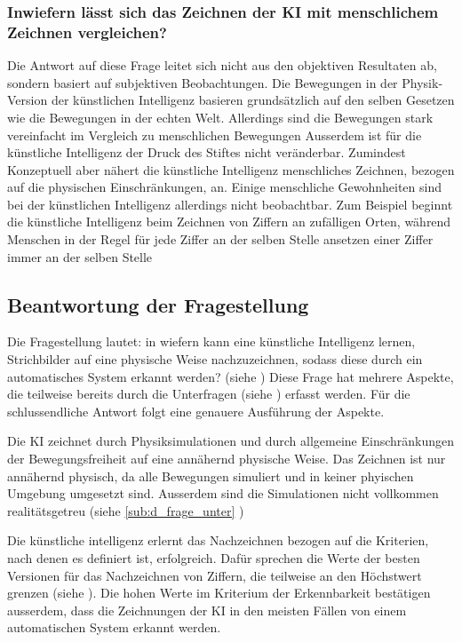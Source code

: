 \subsubsection*{Inwiefern lässt sich das Zeichnen der KI mit menschlichem Zeichnen vergleichen?}
\label{subsub:d_frage_unter_6}
Die Antwort auf diese Frage leitet sich nicht aus den objektiven Resultaten ab,
sondern basiert auf subjektiven Beobachtungen. Die Bewegungen in der
Physik-Version der künstlichen Intelligenz basieren grundsätzlich auf den selben
Gesetzen wie die Bewegungen in der echten Welt. Allerdings sind die Bewegungen
stark vereinfacht im Vergleich zu menschlichen Bewegungen Ausserdem ist für die
künstliche Intelligenz der Druck des Stiftes nicht veränderbar. Zumindest
Konzeptuell aber nähert die künstliche Intelligenz menschliches Zeichnen,
bezogen auf die physischen Einschränkungen, an. Einige menschliche Gewohnheiten
sind bei der künstlichen Intelligenz allerdings nicht beobachtbar. Zum Beispiel
beginnt die künstliche Intelligenz beim Zeichnen von Ziffern an zufälligen
Orten, während Menschen in der Regel für jede Ziffer an der selben Stelle
ansetzen einer Ziffer immer an der selben Stelle


\subsection{Beantwortung der Fragestellung}
\label{sub:d_frage_frag}
Die Fragestellung lautet: in wiefern kann eine künstliche Intelligenz lernen,
Strichbilder auf eine physische Weise nachzuzeichnen, sodass diese durch ein
automatisches System erkannt werden? (siehe ) Diese Frage
hat mehrere Aspekte, die teilweise bereits durch die Unterfragen (siehe
) erfasst werden. Für die schlussendliche Antwort
folgt eine genauere Ausführung der Aspekte.

Die KI zeichnet durch Physiksimulationen und durch allgemeine Einschränkungen
der Bewegungsfreiheit auf eine annähernd physische Weise. Das Zeichnen ist nur
annähernd physisch, da alle Bewegungen simuliert und in keiner phyischen
Umgebung umgesetzt sind. Ausserdem sind die Simulationen nicht vollkommen
realitätsgetreu (siehe \ref{sub:d_frage_unter} )

Die künstliche intelligenz erlernt das Nachzeichnen bezogen auf die Kriterien,
nach denen es definiert ist, erfolgreich. Dafür sprechen die Werte der besten
Versionen für das Nachzeichnen von Ziffern, die teilweise an den Höchstwert
grenzen (siehe ). Die hohen Werte im Kriterium der
Erkennbarkeit bestätigen ausserdem, dass die Zeichnungen der KI in den meisten
Fällen von einem automatischen System erkannt werden.

